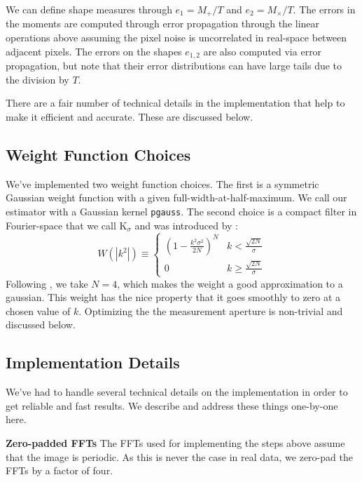 \documentclass[twocolappendix, appendixfloats, numberedappendix, twocolumn, apj]{openjournal}
\newcommand{\ksigma}{\mbox{\boldmath $\mathrm{K}_{\sigma}$}\xspace}
\newcommand{\pgauss}{\texttt{pgauss}\xspace}
\begin{document}
We can define shape measures through $e_1 = M_{+}/T$ and $e_2 = M_{\times}/T$. The errors in the
moments are computed through error propagation through the linear operations above assuming
the pixel noise is uncorrelated in real-space between adjacent pixels. The errors on the shapes
$e_{1,2}$ are also computed via error propagation, but note that their error distributions can have
large tails due to the division by $T$.

There are a fair number of technical details in the implementation that help to make it efficient and
accurate. These are discussed below.

\subsection{Weight Function Choices}

We've implemented two weight function choices. The first is a symmetric Gaussian weight
function with a given full-width-at-half-maximum. We call our estimator with a Gaussian
kernel \pgauss. The second choice is a compact filter
in Fourier-space that we call \ksigma and was introduced by \citet{BernBFD2016}:
\begin{equation}
\label{ksigma}
W\left(|k^2|\right)  \equiv \left\{
\begin{array}{cc}
\left( 1 - \frac{k^2\sigma^2}{2N}\right)^N & k <
                                             \frac{\sqrt{2N}}{\sigma} \\
0 & k \ge
                                             \frac{\sqrt{2N}}{\sigma}
\end{array}
\right.
\end{equation}
Following \citet{BernBFD2016}, we take $N = 4$, which makes the weight a good
approximation to a gaussian.  This weight has the nice property that it goes
smoothly to zero at a chosen value of $k$. Optimizing the the measurement aperture
is non-trivial and discussed below.

\subsection{Implementation Details}

We've had to handle several technical details on the implementation in order to get
reliable and fast results. We describe and address these things one-by-one here.

\textbf{Zero-padded FFTs} The FFTs used for implementing the steps above assume that
the image is periodic. As this is never the case in real data, we zero-pad the FFTs by a
factor of four.
\end{document}
